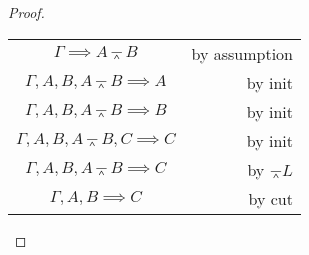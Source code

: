 \documentclass[letterpaper,11pt]{article}
\newcommand{\seq}{\implies}
\newcommand{\nand}{\barwedge}
\begin{document}
\begin{proof} ~

    \begin{center}
        \begin{tabular}{c r}
            $\Gamma \seq A \nand B$
            &
            by assumption \\
            $\Gamma, A, B, A \nand B \seq A$
            &
            by init \\
            $\Gamma, A, B, A \nand B \seq B$
            &
            by init \\
            $\Gamma, A, B, A \nand B, C \seq C$
            &
            by init \\
            $\Gamma, A, B, A \nand B \seq C$
            &
            by $\nand L$ \\
            $\Gamma, A, B \seq C$
            &
            by cut
        \end{tabular}
    \end{center}
\end{proof}
\end{document}
